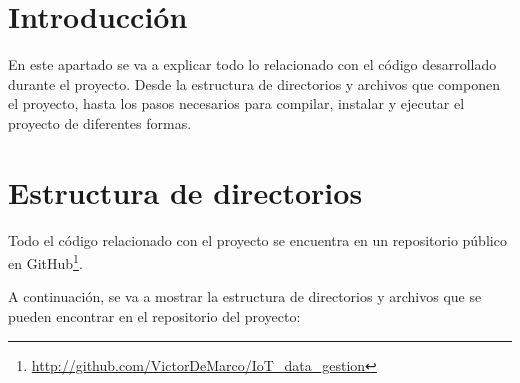 
\section{Introducción}
En este apartado se va a explicar todo lo relacionado con el código desarrollado durante el proyecto. Desde la estructura de directorios y archivos que componen el proyecto, hasta los pasos necesarios para  compilar, instalar y ejecutar el proyecto de diferentes formas.
\section{Estructura de directorios}
Todo el código relacionado con el proyecto se encuentra en un repositorio público en
GitHub\footnote{\href{http://github.com/VictorDeMarco/IoT_data_gestion}{http://github.com/VictorDeMarco/IoT\_data\_gestion}}. 

A continuación, se va a mostrar la estructura de directorios y archivos que se pueden encontrar en el repositorio del proyecto:


